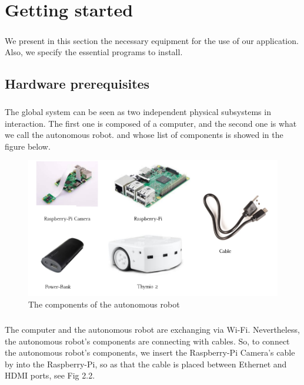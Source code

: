 \documentclass[12pt]{report}
\begin{document}
\chapter{Getting started}
\paragraph{}
We present in this section the necessary equipment for the use of our application. Also, we specify the essential programs to install.
\section{Hardware prerequisites}
\paragraph{}
The global system can be seen as two independent physical subsystems in interaction. The first one is composed of a computer, and the second one is what we call the autonomous robot. and whose list of components is showed in the figure below.
\begin{figure}[H]
	\begin{center}
		\includegraphics[scale=0.6]{res/comp.png}
		\caption{The components of the autonomous robot}
	\end{center}
\end{figure}
\paragraph{}
The computer and the autonomous robot are exchanging via Wi-Fi. Nevertheless, the autonomous robot's components are connecting with cables. 
So, to connect the autonomous robot's components, we insert the Raspberry-Pi Camera's cable by into the Raspberry-Pi, so as that the cable is placed between Ethernet and HDMI ports, see Fig 2.2. 
\end{document}
